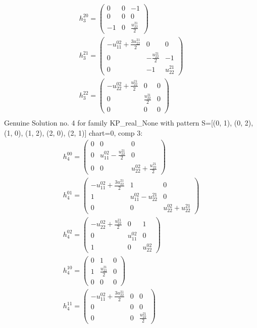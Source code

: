 \documentclass[a4paper, 11pt, twoside, onecolumn]{article}
\begin{document}
\begin{landscape}
\begin{gather*}
	 h_{3}^{20}=\begin{pmatrix}0 & 0 & -1\\0 & 0 & 0\\-1 & 0 & \frac{u^{21}_{22}}{2}\end{pmatrix}\\ 
	 h_{3}^{21}=\begin{pmatrix}- u^{02}_{11} + \frac{3 u^{21}_{22}}{2} & 0 & 0\\0 & - \frac{u^{21}_{22}}{2} & -1\\0 & -1 & u^{21}_{22}\end{pmatrix}\\ 
	 h_{3}^{22}=\begin{pmatrix}- u^{02}_{22} + \frac{u^{21}_{22}}{2} & 0 & 0\\0 & \frac{u^{21}_{22}}{2} & 0\\0 & 0 & 0\end{pmatrix}\\ 
\end{gather*} 
Genuine Solution no. 4 for family KP_real_None with pattern S=[(0, 1), (0, 2), (1, 0), (1, 2), (2, 0), (2, 1)] chart=0, comp 3: 
\begin{gather*} 
	 h_{4}^{00}=\begin{pmatrix}0 & 0 & 0\\0 & u^{02}_{11} - \frac{u^{21}_{22}}{2} & 0\\0 & 0 & u^{02}_{22} + \frac{u^{21}_{22}}{2}\end{pmatrix}\\ 
	 h_{4}^{01}=\begin{pmatrix}- u^{02}_{11} + \frac{3 u^{21}_{22}}{2} & 1 & 0\\1 & u^{02}_{11} - u^{21}_{22} & 0\\0 & 0 & u^{02}_{22} + u^{21}_{22}\end{pmatrix}\\ 
	 h_{4}^{02}=\begin{pmatrix}- u^{02}_{22} + \frac{u^{21}_{22}}{2} & 0 & 1\\0 & u^{02}_{11} & 0\\1 & 0 & u^{02}_{22}\end{pmatrix}\\ 
	 h_{4}^{10}=\begin{pmatrix}0 & 1 & 0\\1 & \frac{u^{21}_{22}}{2} & 0\\0 & 0 & 0\end{pmatrix}\\ 
	 h_{4}^{11}=\begin{pmatrix}- u^{02}_{11} + \frac{3 u^{21}_{22}}{2} & 0 & 0\\0 & 0 & 0\\0 & 0 & \frac{u^{21}_{22}}{2}\end{pmatrix}\\ 

\end{gather*}
\end{landscape}
\end{document}
